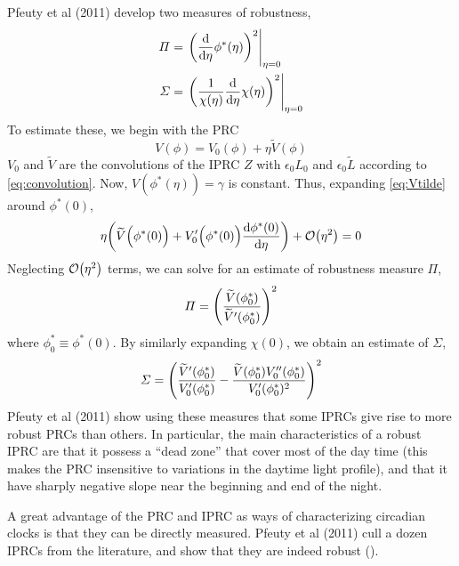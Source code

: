 Pfeuty et al (2011) develop two measures of robustness,
\begin{equation}
\begin{aligned}
\varPi &=\eval{\qty(\dv{\eta} \phi^{*}(\eta) )^{2}}_{\eta=0}
\\
\varSigma &=\eval{\qty(\frac{1}{\chi(\eta)}
\dv{\eta} \chi(\eta) )^{2}}_{\eta=0}
\end{aligned}
\end{equation}
To estimate these, we begin with the PRC
\begin{equation}\label{eq:Vtilde}
V(\phi)=V_{0}(\phi)
+\eta\widetilde{V}(\phi)
\end{equation}
$V_{0}$ and $\widetilde{V}$ are the convolutions of the IPRC 
$Z$ with $\epsilon_{0}L_{0}$ and 
$\epsilon_{0}\widetilde{L}$ according to \eqref{eq:convolution}. Now, 
$V({\phi}^{*}(\eta))=\gamma$ is constant. Thus, expanding
\eqref{eq:Vtilde} around $\phi^{*}(0)$, 
\begin{equation}
\eta \qty(\widetilde{V}\Big(\phi^{*}(0)\Big)
+{V}_{0}'\Big(\phi^*(0)\Big)\dv{\phi^{*}(0)}{\eta})
+\order{\eta^2} = 0
\end{equation}
Neglecting $\order{\eta^2}$ terms, we can solve for an estimate of
robustness measure $\varPi$,
\begin{equation}
\varPi=\qty(
\frac{\widetilde{V}(\phi_{0}^{*})}
{\widetilde{V}'(\phi_{0}^{*})}
)^{2}
\end{equation}
where $\phi_{0}^{*}\equiv\phi^{*}(0)$. By similarly
expanding $\chi(0)$, we obtain an estimate of $\varSigma$,
\begin{equation}
\varSigma =\qty(
\frac{\widetilde{V}'(\phi_0^{*})}
{V_0'(\phi_0^{*})}
-\frac{\widetilde{V}(\phi_0^{*}){V}_0''(\phi_0^{*})}
{V_0'(\phi_0^{*})^{2}}
)^{2}
\end{equation}
Pfeuty et al (2011) show using these measures that some IPRCs give
rise to more robust PRCs than others. In particular, the main
characteristics of a robust IPRC are that it possess a “dead zone”
that cover most of the day time (this makes the PRC insensitive to
variations in the daytime light profile), and that it have sharply
negative slope near the beginning and end of the night. 

A great advantage of the PRC and IPRC as ways of characterizing
circadian clocks is that they can be directly measured. Pfeuty et al
(2011) cull a dozen IPRCs from the literature, and show that they are
indeed robust (). 



